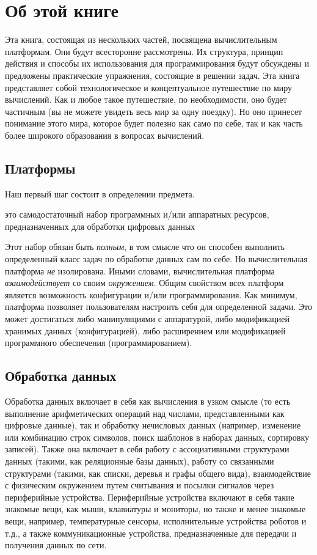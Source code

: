 \chapter{Об этой книге}

Эта книга, состоящая из нескольких частей, посвящена вычислительным платформам.
Они будут всесторонне рассмотрены.  Их структура, принцип действия
и способы их использования для программирования будут обсуждены и предложены практические упражнения, состоящие в решении задач.   
Эта книга представляет собой технологическое и концептуальное путешествие по миру вычислений.  Как и любое такое путешествие, по необходимости, оно будет частичным
(вы не можете увидеть весь мир за одну поездку).  Но оно принесет понимание этого мира,
которое будет полезно как само по себе, так и как часть более широкого образования 
в вопросах вычислений.
  
\section{Платформы}

Наш первый шаг состоит в определении предмета.
\begin{definition} это самодостаточный набор программных и/или
аппаратных ресурсов, предназначенных для обработки цифровых данных
\end{definition}

Этот набор обязан быть \emph{полным}, в том смысле что он способен выполнить определенный класс задач по обработке данных сам по себе.  Но вычислительная платформа
\emph{не} изолирована.  Иными словами, вычислительная платформа \emph{взаимодействует} со своим \emph{окружением}.  Общим свойством всех платформ является возможность конфигурации и/или программирования.  Как минимум, платформа
позволяет пользователям настроить себя для определенной задачи.  Это может достигаться
либо манипуляциями с аппаратурой, либо модификацией хранимых данных (конфигурацией), либо расширением или модификацией программного обеспечения (программированием).

\section{Обработка данных}

Обработка данных включает в себя как вычисления в узком смысле (то есть выполнение арифметических операций над числами, представленными как цифровые данные), так и обработку нечисловых данных (например, изменение или комбинацию строк символов, поиск шаблонов в наборах данных, сортировку записей).  Также она включает в себя работу с ассоциативными структурами данных (такими, как реляционные базы данных), работу со связанными структурами (такими, как списки, деревья и графы общего вида), взаимодействие с физическим окружением путем считывания и посылки сигналов через периферийные устройства.  Периферийные устройства включают в себя такие знакомые вещи, как мыши, клавиатуры и мониторы, но также и менее знакомые вещи, например, температурные сенсоры, исполнительные устройства роботов и т.д., а также коммуникационные устройства, предназначенные для передачи и получения данных по сети.

